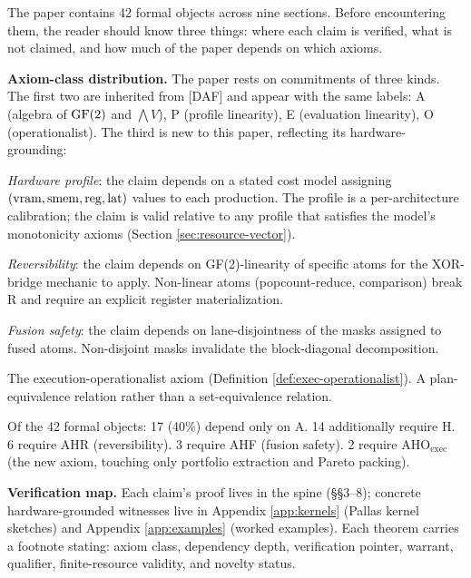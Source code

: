 The paper contains 42 formal objects across nine sections.
Before encountering them, the reader should know three
things: where each claim is verified, what is not claimed,
and how much of the paper depends on which axioms.

\medskip
\noindent\textbf{Axiom-class distribution.}
The paper rests on commitments of three kinds. The first
two are inherited from [DAF] and appear with the same
labels: \textsf{A} (algebra of $\operatorname{GF}(2)$ and $\bigwedge V$),
\textsf{P} (profile linearity), \textsf{E} (evaluation
linearity), \textsf{O} (operationalist). The third is
new to this paper, reflecting its hardware-grounding:

\begin{description}[nosep,leftmargin=1.5cm]
  \item[\textsf{H}] \emph{Hardware profile}: the claim
    depends on a stated cost model assigning $(\operatorname{vram},
    \operatorname{smem}, \operatorname{reg}, \operatorname{lat})$ values to each production. The
    profile is a per-architecture calibration; the claim
    is valid relative to any profile that satisfies the
    model's monotonicity axioms (Section \ref{sec:resource-vector}).
  \item[\textsf{R}] \emph{Reversibility}: the claim
    depends on GF(2)-linearity of specific atoms for the
    XOR-bridge mechanic to apply. Non-linear atoms
    (popcount-reduce, comparison) break \textsf{R} and
    require an explicit register materialization.
  \item[\textsf{F}] \emph{Fusion safety}: the claim
    depends on lane-disjointness of the masks assigned
    to fused atoms. Non-disjoint masks invalidate the
    block-diagonal decomposition.
  \item[\textsf{O}$_{\mathrm{exec}}$] The
    execution-operationalist axiom
    (Definition \ref{def:exec-operationalist}).
    A plan-equivalence relation rather than a
    set-equivalence relation.
\end{description}

Of the 42 formal objects: 17 (40\%) depend only on
\textsf{A}. 14 additionally require \textsf{H}. 6 require
\textsf{AHR} (reversibility). 3 require \textsf{AHF} (fusion
safety). 2 require \textsf{AHO}$_{\mathrm{exec}}$ (the new
axiom, touching only portfolio extraction and Pareto
packing).

\medskip
\noindent\textbf{Verification map.}
Each claim's proof lives in the spine (\S\S3--8); concrete
hardware-grounded witnesses live in Appendix \ref{app:kernels}
(Pallas kernel sketches) and Appendix \ref{app:examples}
(worked examples). Each theorem carries a footnote stating:
axiom class, dependency depth, verification pointer, warrant,
qualifier, finite-resource validity, and novelty status.

